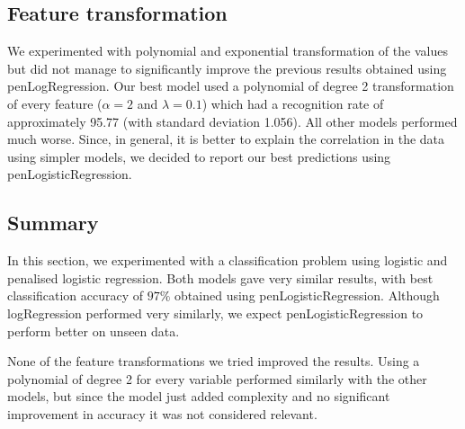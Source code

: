 \subsection{Feature transformation}
We experimented with polynomial and exponential transformation of the values but did not manage to significantly improve the previous results obtained using penLogRegression. Our best model used a polynomial of degree 2 transformation of every feature ($\alpha=2$ and $\lambda=0.1$) which had a recognition rate of approximately 95.77 (with standard deviation 1.056). All other models performed much worse.
Since, in general, it is better to explain the correlation in the data using simpler models, we decided to report our best predictions using penLogisticRegression.

\subsection{Summary}

In this section, we experimented with a classification problem using logistic and penalised logistic regression. Both models gave very similar results, with best classification accuracy of $97\%$ obtained using penLogisticRegression. Although logRegression performed very similarly, we expect penLogisticRegression to perform better on unseen data.

None of the feature transformations we tried improved the results. Using a polynomial of degree 2 for every variable performed similarly with the other models, but since the model just added complexity and no significant improvement in accuracy it was not considered relevant.